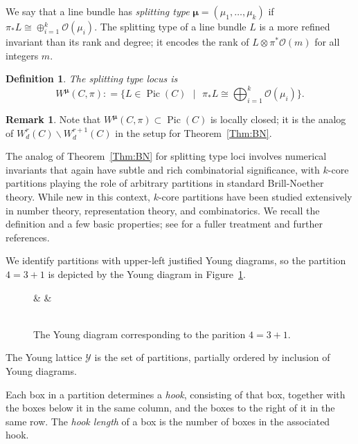 \documentclass{amsart}
\newtheorem{definition}[theorem]{Definition}
\theoremstyle{definition}
\newtheorem{remark}[theorem]{Remark}
\def\bmu{\bm{\mu}}
\newcommand{\cO}{\mathcal{O}}
\newcommand{\Pic}{\operatorname{Pic}}
\begin{document}
We say that a line bundle has \emph{splitting type} $\bmu = (\mu_1 , \ldots , \mu_k)$ if $\pi_* L \cong \oplus_{i=1}^k \cO (\mu_i)$.  The splitting type of a line bundle $L$ is a more refined invariant than its rank and degree; it encodes the rank of $L \otimes \pi^* \cO (m)$ for all integers $m$.  
\begin{definition}
The \emph{splitting type locus} is
\[
W^{\bmu} (C,\pi) \colon = \Big\{ L \in \Pic (C) \mbox{ } \vert \mbox{ } \pi_* L \cong \bigoplus_{i=1}^k \cO (\mu_i) \Big\} .
\]
\end{definition}

\begin{remark}
Note that $W^{\bmu}(C,\pi) \subset \Pic(C)$ is locally closed; it is the analog of $W^r_d(C) \smallsetminus W^{r+1}_d(C)$ in the setup for Theorem~\ref{Thm:BN}.  
\end{remark}

The analog of Theorem~\ref{Thm:BN} for splitting type loci involves numerical invariants that again have subtle and rich combinatorial significance, with $k$-core partitions playing the role of arbitrary partitions in standard Brill-Noether theory. While new in this context, $k$-core partitions have been studied extensively in number theory, representation theory, and combinatorics.  We recall the definition and a few basic properties; see \cite{LLMSSZ} for a fuller treatment and further references.  


We identify partitions with upper-left justified Young diagrams, so the partition $4 = 3 + 1$ is depicted by the Young diagram in Figure~\ref{Fig:4=3+1}.
\begin{figure} [h!]
\begin{center}
\begin{ytableau}
{} & {} & {} \\
{} \\
\end{ytableau}
\end{center}
\caption{The Young diagram corresponding to the parition $4 = 3 + 1$.}
\label{Fig:4=3+1}
\end{figure}
The Young lattice $\mathcal{Y}$ is the set of partitions, partially ordered by inclusion of Young diagrams. 

Each box in a partition determines a \emph{hook}, consisting of that box, together with the boxes below it in the same column, and the boxes to the right of it in the same row.  The \emph{hook length} of a box is the number of boxes in the associated hook.  
\end{document}
